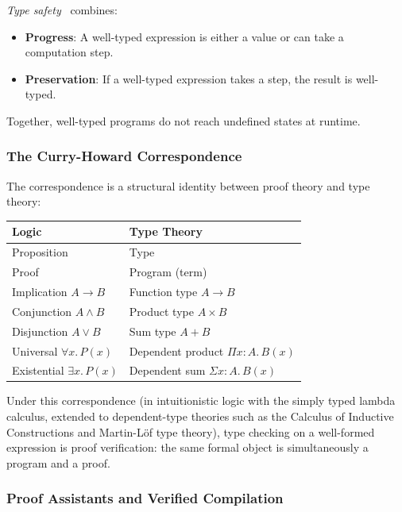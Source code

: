 \documentclass[a4paper,twocolumn,11pt]{article}
\begin{document}
\emph{Type safety}~\cite{Milner1978,WrightFelleisen1994} combines:
\begin{itemize}[noitemsep]
\item \textbf{Progress}: A well-typed expression is either a value or can take a computation step.
\item \textbf{Preservation}: If a well-typed expression takes a step, the result is well-typed.
\end{itemize}
Together, well-typed programs do not reach undefined states at runtime.

\subsubsection*{The Curry-Howard Correspondence~\cite{Howard1980,Curry1958}}

The correspondence is a structural identity between proof theory and type theory:

\begin{center}
\begin{tabular}{@{}ll@{}}
\toprule
Logic & Type Theory \\
\midrule
Proposition & Type \\
Proof & Program (term) \\
Implication $A \to B$ & Function type $A \to B$ \\
Conjunction $A \wedge B$ & Product type $A \times B$ \\
Disjunction $A \vee B$ & Sum type $A + B$ \\
Universal $\forall x.\, P(x)$ & Dependent product $\Pi x{:}A.\, B(x)$ \\
Existential $\exists x.\, P(x)$ & Dependent sum $\Sigma x{:}A.\, B(x)$ \\
\bottomrule
\end{tabular}
\end{center}

Under this correspondence (in intuitionistic logic with the simply typed lambda calculus, extended to dependent-type theories such as the Calculus of Inductive Constructions and Martin-L\"of type theory), type checking on a well-formed expression is proof verification: the same formal object is simultaneously a program and a proof.

\subsubsection*{Proof Assistants and Verified Compilation}
\end{document}
